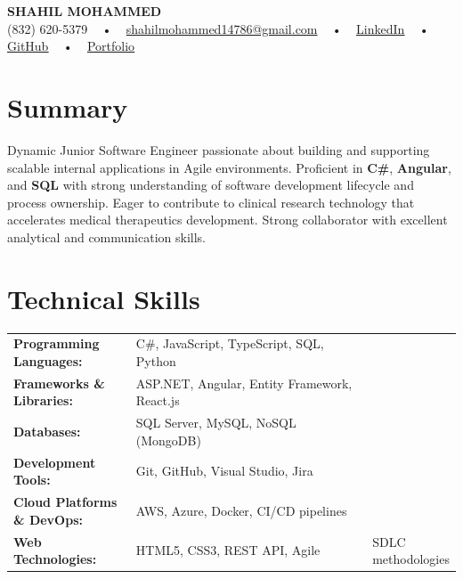 \documentclass[letterpaper,11pt]{article}
\begin{document}
\begin{center}
    {\fontsize{14pt}{12pt}\selectfont \textbf{\MakeUppercase{Shahil Mohammed}}}\\ \vspace{2pt}
    \fontsize{10pt}{12pt}\selectfont (832) 620-5379 ~ • ~ \href{mailto:shahilmohammed14786@gmail.com}{shahilmohammed14786@gmail.com} ~ • ~  
    \href{https://www.linkedin.com/in/shahil-mohammed-9652931a1/}{\color{blue}\underline{LinkedIn}}  ~ • ~ 
    \href{https://github.com/freakbeast14}{\color{blue}\underline{GitHub}} ~ • ~ 
    \href{https://shahil-mohammed.netlify.app/}{\color{blue}\underline{Portfolio}}
    \vspace{-8pt}
\end{center}

\section{Summary}
\fontsize{9pt}{10pt}\selectfont
Dynamic Junior Software Engineer passionate about building and supporting scalable internal applications in Agile environments. Proficient in \textbf{C\#}, \textbf{Angular}, and \textbf{SQL} with strong understanding of software development lifecycle and process ownership. Eager to contribute to clinical research technology that accelerates medical therapeutics development. Strong collaborator with excellent analytical and communication skills.
 \vspace{-5pt}
 
\section{Technical Skills}
        \vspace{-14pt}
        \begin{table}[h]
            \fontsize{9pt}{10pt}\selectfont
            \begin{tabular}{p{0.3\linewidth} p{0.7\linewidth}}
                \textbf{Programming Languages:} & C\#, JavaScript, TypeScript, SQL, Python \\
                \textbf{Frameworks \& Libraries:} & ASP.NET, Angular, Entity Framework, React.js \\
                \textbf{Databases:} & SQL Server, MySQL, NoSQL (MongoDB) \\
                \textbf{Development Tools:} & Git, GitHub, Visual Studio, Jira \\
                \textbf{Cloud Platforms \& DevOps:} & AWS, Azure, Docker, CI/CD pipelines \\
                \textbf{Web Technologies:} & HTML5, CSS3, REST API, Agile & SDLC methodologies \\
            \end{tabular}
        \end{table}
 \vspace{-15pt}
 
\end{document}
